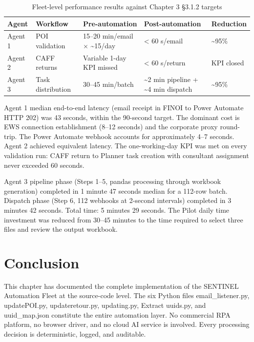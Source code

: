 \begin{table}[H]
  \centering
  \caption{Fleet-level performance results against Chapter 3 \S{}3.1.2 targets}
  \renewcommand{\arraystretch}{1.0}
  \footnotesize
  \begin{tabularx}{\textwidth}{|>{\raggedright\arraybackslash}p{2.3cm}|X|X|X|X|}
    \hline
    \textbf{Agent} & \textbf{Workflow} & \textbf{Pre-automation} & \textbf{Post-automation} & \textbf{Reduction} \\ \hline
    Agent 1 & POI validation & 15--20 min/email $\times$ \textasciitilde{}15/day & \textless{} 60 s/email & \textasciitilde{}95\% \\ \hline
    Agent 2 & CAFF returns & Variable 1-day KPI missed & \textless{} 60 s/return & KPI closed \\ \hline
    Agent 3 & Task distribution & 30--45 min/batch & \textasciitilde{}2 min pipeline + \textasciitilde{}4 min dispatch & \textasciitilde{}95\% \\ \hline
  \end{tabularx}
\end{table}

Agent 1 median end-to-end latency (email receipt in FINOI to Power Automate HTTP 202) was 43 seconds, within the 90-second target. The dominant cost is EWS connection establishment (8--12 seconds) and the corporate proxy round-trip. The Power Automate webhook accounts for approximately 4--7 seconds. Agent 2 achieved equivalent latency. The one-working-day KPI was met on every validation run: CAFF return to Planner task creation with consultant assignment never exceeded 60 seconds.

Agent 3 pipeline phase (Steps 1--5, pandas processing through workbook generation) completed in 1 minute 47 seconds median for a 112-row batch. Dispatch phase (Step 6, 112 webhooks at 2-second intervals) completed in 3 minutes 42 seconds. Total time: 5 minutes 29 seconds. The Pilot daily time investment was reduced from 30--45 minutes to the time required to select three files and review the output workbook.

\section*{Conclusion}

This chapter has documented the complete implementation of the SENTINEL Automation Fleet at the source-code level. The six Python files email\_listener.py, updatePOI.py, updateretour.py, updating.py, Extract uuids.py, and uuid\_map.json constitute the entire automation layer. No commercial RPA platform, no browser driver, and no cloud AI service is involved. Every processing decision is deterministic, logged, and auditable.


